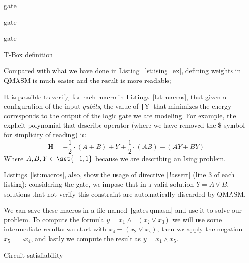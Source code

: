 \begin{listing}[h]
	\centering
	\begin{sublisting}[c]{0.28\linewidth}
		\caption{ gate}
		\label{lst:and_gate}
	\end{sublisting}
	\quad
	\begin{sublisting}[c]{0.28\linewidth}
		\caption{ gate}
		\label{lst:not_gate}
	\end{sublisting}
	\quad
	\begin{sublisting}[c]{0.28\linewidth}
		\caption{ gate}
		\label{lst:or_gate}
	\end{sublisting}
	\caption{T-Box definition}
	\label{lst:macros}
\end{listing}

Compared with what we have done in Listing~\ref{lst:ising_ex}, defining weights in QMASM is much easier and the result is more readable;

It is possible to verify, for each macro in Listings~\ref{lst:macros}, that given a configuration of the input \emph{qubits}, the value of \texttt|Y| that minimizes the energy corresponds to the output of the logic gate we are modeling. For example, the explicit polynomial that describe  operator (where we have removed the $\$$ symbol for simplicity of reading) is:
\[
	\mathbf{H} = -\frac{1}{2}\cdot(A + B) + Y + \frac{1}{2}\cdot(AB) - (AY + BY)
\]
Where $A, B, Y \in \set{-1, 1}$ because we are describing an Ising problem.

Listings~\ref{lst:macros}, also, show the usage of directive \texttt|!assert| (line $3$ of each listing): considering the  gate, we impose that in a valid solution $Y = A \lor B$, solutions that not verify this constraint are automatically discarded by QMASM.

We can save these macros in a file named \texttt|gates.qmasm| and use it to solve our problem. To compute the formula $y = x_1 \land \neg(x_2 \lor x_3)$ we will use some intermediate results: we start with $x_4 = (x_2 \lor x_3)$, then we apply the negation $x_5 = \neg x_4$, and lastly we compute the result as $y = x_1 \land x_5$. 

\begin{listing}[h]
	\caption{Circuit satisfiability}
	\label{lst:circ_sat_qmasm}
\end{listing}

